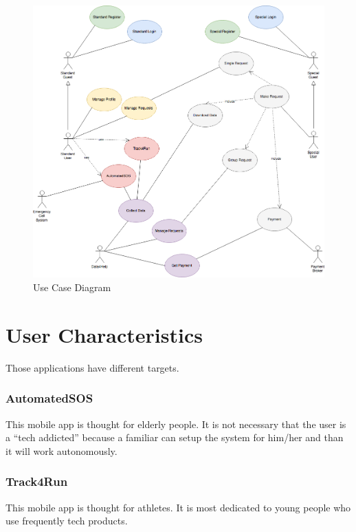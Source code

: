 \begin{figure}[H]
\begin{center}
  \includegraphics[width=\textwidth]{img/UseCase_Diagram.png}
  \hspace{0.05\linewidth}
  \centering
  \caption{Use Case Diagram}
  \label{img:UseCase_Diagram}
\end{center}
\end{figure}

\section{User Characteristics}
Those applications have different targets.

\subsubsection{AutomatedSOS}
This mobile app is thought for elderly people. It is not necessary that the user is a “tech addicted” because a familiar can setup the system for him/her and than it will work autonomously.

\subsubsection{Track4Run}
This mobile app is thought for athletes. It is most dedicated to young people who use frequently tech products.


